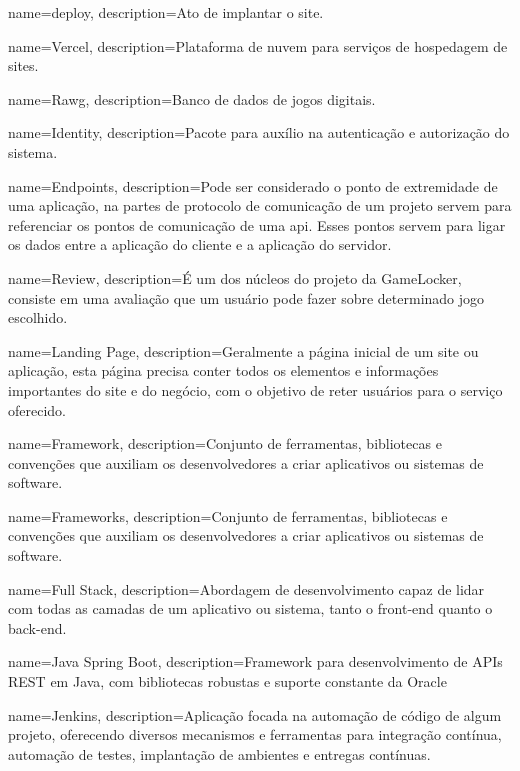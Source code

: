  {
    name=deploy,
    description={Ato de implantar o site.}
}

 {
    name=Vercel,
    description={Plataforma de nuvem para serviços de hospedagem de sites.}
}

 {
    name=Rawg,
    description={Banco de dados de jogos digitais.}
}

 {
    name=Identity,
    description={Pacote para auxílio na autenticação e autorização do sistema.}
}

 {
    name=Endpoints,
    description={Pode ser considerado o ponto de extremidade de uma aplicação, na partes de protocolo de comunicação de um projeto servem para referenciar os pontos de comunicação de uma \ac{api}. Esses pontos servem para ligar os dados entre a aplicação do cliente e a aplicação do servidor.}
}

 {
    name=Review,
    description={É um dos núcleos do projeto da GameLocker, consiste em uma avaliação que um usuário pode fazer sobre determinado jogo escolhido.}
}

 {
    name=Landing Page,
    description={Geralmente a página inicial de um site ou aplicação, esta página precisa conter todos os elementos e informações importantes do site e do negócio, com o objetivo de reter usuários para o serviço oferecido.}
}

 {
    name=Framework,
    description={Conjunto de ferramentas, bibliotecas e convenções que auxiliam os desenvolvedores a criar aplicativos ou sistemas de software.}
}

 {
    name=Frameworks,
    description={Conjunto de ferramentas, bibliotecas e convenções que auxiliam os desenvolvedores a criar aplicativos ou sistemas de software.}
}

 {
    name=Full Stack,
    description={Abordagem de desenvolvimento capaz de lidar com todas as camadas de um aplicativo ou sistema, tanto o front-end quanto o back-end.}
}

 {
    name=Java Spring Boot,
    description={Framework para desenvolvimento de APIs REST em Java, com bibliotecas robustas e suporte constante da Oracle}
}

 {
    name=Jenkins,
    description={Aplicação focada na automação de código de algum projeto, oferecendo diversos mecanismos e ferramentas para integração contínua, automação de testes, implantação de ambientes e entregas contínuas.}
}

